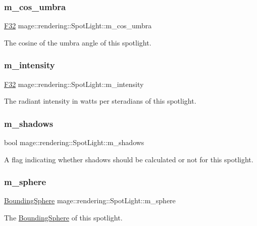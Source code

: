 \subsubsection{\texorpdfstring{m\+\_\+cos\+\_\+umbra}{m\_cos\_umbra}}
{\footnotesize\ttfamily \mbox{\hyperlink{namespacemage_aa97e833b45f06d60a0a9c4fc22ae02c0}{F32}} mage\+::rendering\+::\+Spot\+Light\+::m\+\_\+cos\+\_\+umbra\hspace{0.3cm}{\ttfamily [private]}}

The cosine of the umbra angle of this spotlight. \mbox{\label{classmage_1_1rendering_1_1_spot_light_af91b9fc5303e5c2c5e90337f42db015c}} 
\subsubsection{\texorpdfstring{m\+\_\+intensity}{m\_intensity}}
{\footnotesize\ttfamily \mbox{\hyperlink{namespacemage_aa97e833b45f06d60a0a9c4fc22ae02c0}{F32}} mage\+::rendering\+::\+Spot\+Light\+::m\+\_\+intensity\hspace{0.3cm}{\ttfamily [private]}}

The radiant intensity in watts per steradians of this spotlight. \mbox{\label{classmage_1_1rendering_1_1_spot_light_aa2e1e955cf9fb12a9e064cc523cbbe26}} 
\subsubsection{\texorpdfstring{m\+\_\+shadows}{m\_shadows}}
{\footnotesize\ttfamily bool mage\+::rendering\+::\+Spot\+Light\+::m\+\_\+shadows\hspace{0.3cm}{\ttfamily [private]}}

A flag indicating whether shadows should be calculated or not for this spotlight. \mbox{\label{classmage_1_1rendering_1_1_spot_light_a24667e6bec37a402627c20283795de95}} 
\subsubsection{\texorpdfstring{m\+\_\+sphere}{m\_sphere}}
{\footnotesize\ttfamily \mbox{\hyperlink{classmage_1_1_bounding_sphere}{Bounding\+Sphere}} mage\+::rendering\+::\+Spot\+Light\+::m\+\_\+sphere\hspace{0.3cm}{\ttfamily [private]}}

The \mbox{\hyperlink{classmage_1_1_bounding_sphere}{Bounding\+Sphere}} of this spotlight. 